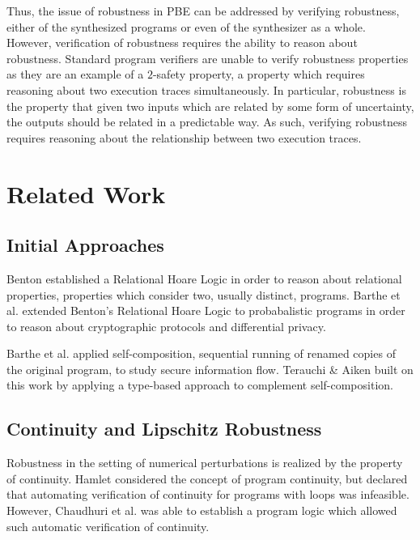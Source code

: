 \documentclass{llncs}
\begin{document}
Thus, the issue of robustness in PBE can be addressed by verifying robustness,
either of the synthesized programs or even of the synthesizer as a whole.
However, verification of robustness requires the ability to reason about
robustness.  Standard program verifiers are unable to verify robustness
properties as they are an example of a \(2\)-safety property, a property which
requires reasoning about two execution traces simultaneously.  In particular,
robustness is the property that given two inputs which are related by some form
of uncertainty, the outputs should be related in a predictable way.  As such,
verifying robustness requires reasoning about the relationship between two
execution traces.

\section{Related Work}

  \subsection{Initial Approaches}
    \space\space Benton \cite{benton} established a
    Relational Hoare Logic in order to reason about relational properties,
    properties which consider two, usually distinct, programs.  Barthe et al.
    \cite{barthecrypto,bartheprivacy} extended Benton's Relational Hoare Logic to
    probabalistic programs in order to reason about cryptographic protocols and
    differential privacy.
    \smallskip

    \space\space Barthe et al.
    \cite{barthecomposition} applied self-composition, sequential running of renamed
    copies of the original program, to study secure information flow.  Terauchi \&
    Aiken \cite{terauchi05} built on this work by applying a type-based approach to
    complement self-composition.
    \smallskip

  \subsection{Continuity and Lipschitz Robustness}
    \space\space Robustness in the setting of numerical perturbations
    is realized by the property of continuity.  Hamlet \cite{hamlet02} considered the
    concept of program continuity, but declared that automating verification of
    continuity for programs with loops was infeasible.  However, Chaudhuri et al.
    \cite{chaudhuri10} was able to establish a program logic which allowed such
    automatic verification of continuity.
    \smallskip
\end{document}
